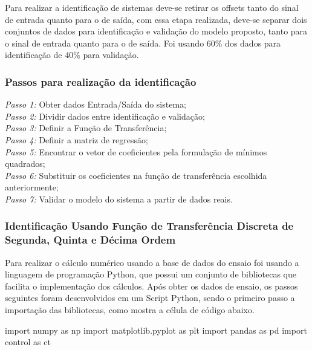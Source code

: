 Para realizar a identificação de sistemas deve-se retirar os offsets tanto do sinal de entrada quanto para o de saída, com essa etapa realizada, deve-se separar dois conjuntos de dados para identificação e validação do modelo proposto, tanto para o sinal de entrada quanto para o de saída. Foi usando 60\% dos dados para identificação de 40\% para validação.

\subsubsection{Passos para realização da identificação}


\textit{Passo 1:} Obter dados Entrada/Saída do sistema;\\
\textit{Passo 2:} Dividir dados entre identificação e validação;\\
\textit{Passo 3:} Definir a Função de Transferência;\\
\textit{Passo 4:} Definir a matriz de regressão;\\
\textit{Passo 5:} Encontrar o vetor de coeficientes pela formulação de mínimos quadrados;\\
\textit{Passo 6:} Substituir os coeficientes na função de transferência escolhida anteriormente;\\
\textit{Passo 7:} Validar o modelo do sistema a partir de dados reais.\\


\subsubsection{Identificação Usando Função de Transferência Discreta de Segunda, Quinta e Décima Ordem}

Para realizar o cálculo numérico usando a base de dados do ensaio foi usando a linguagem de programação Python, que possui um conjunto de bibliotecas que facilita o implementação dos cálculos. Após obter os dados de ensaio, os passos seguintes foram desenvolvidos em um Script Python, sendo o primeiro passo a importação das bibliotecas, como mostra a célula de código abaixo.

\vspace{0.5cm}

\begin{python}
import numpy as np 
import matplotlib.pyplot as plt
import pandas as pd
import control as ct
\end{python}


